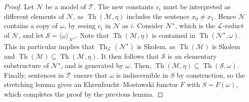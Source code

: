 \begin{proof}
	Let \( \mathcal N \) be a model of \( \mathcal T \).
	The new constants \( c_i \) must be interpreted as different elements of \( \mathcal N \), as \( \operatorname{Th}(\mathcal M, \eta) \) includes the sentence \( x_0 \neq x_1 \).
	Hence \( \mathcal N \) contains a copy of \( \omega \), by seeing \( c_i \) in \( \mathcal N \) as \( i \).
	Consider \( \mathcal N^\star \), which is the \( \mathcal L \)-reduct of \( \mathcal N \), and let \( \mathcal S = \langle \omega \rangle_{\mathcal N^\star} \).
	Note that \( \operatorname{Th}(\mathcal M, \eta) \) is contained in \( \operatorname{Th}(\mathcal N^\star, \omega) \).
	This in particular implies that \( \operatorname{Th}_{\mathcal L}(\mathcal N^\star) \) is Skolem, as \( \operatorname{Th}(\mathcal M) \) is Skolem and \( \operatorname{Th}(\mathcal M) \subseteq \operatorname{Th}(\mathcal M, \eta) \).
	It then follows that \( \mathcal S \) is an elementary substructure of \( \mathcal N^\star \), and is generated by \( \omega \).
	Then, \( \operatorname{Th}(\mathcal M, \eta) \subseteq \operatorname{Th}(\mathcal S, \omega) \).
	Finally, sentences in \( \mathcal T \) ensure that \( \omega \) is indiscernible in \( S \) by construction, so the stretching lemma gives an Ehrenfeucht--Mostowski functor \( F \) with \( S = F(\omega) \), which completes the proof by the previous lemma.
\end{proof}

